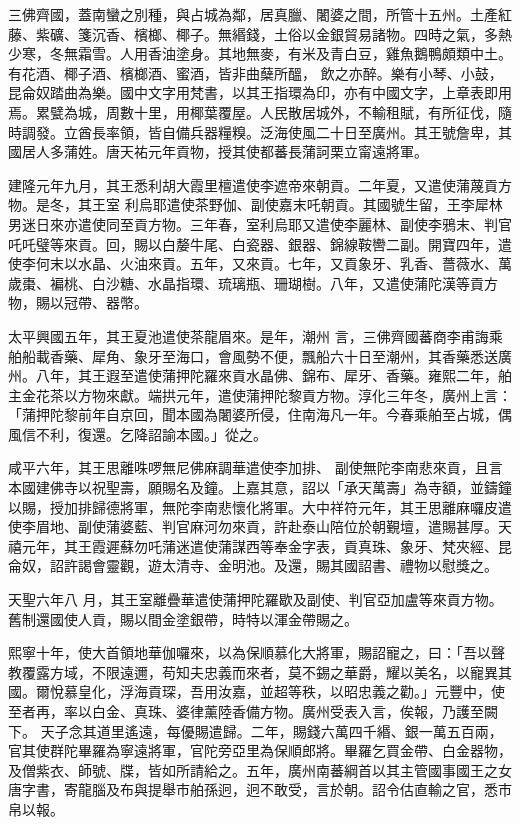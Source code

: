 \begin{pinyinscope}
 三佛齊國，蓋南蠻之別種，與占城為鄰，居真臘、闍婆之間，所管十五州。土產紅藤、紫礦、箋沉香、檳榔、椰子。無緡錢，土俗以金銀貿易諸物。四時之氣，多熱少寒，冬無霜雪。人用香油塗身。其地無麥，有米及青白豆，雞魚鵝鴨頗類中土。有花酒、椰子酒、檳榔酒、蜜酒，皆非曲蘖所醞，
 飲之亦醉。樂有小琴、小鼓，昆侖奴踏曲為樂。國中文字用梵書，以其王指環為印，亦有中國文字，上章表即用焉。累甓為城，周數十里，用椰葉覆屋。人民散居城外，不輸租賦，有所征伐，隨時調發。立酋長率領，皆自備兵器糧糗。泛海使風二十日至廣州。其王號詹卑，其國居人多蒲姓。唐天祐元年貢物，授其使都蕃長蒲訶栗立甯遠將軍。



 建隆元年九月，其王悉利胡大霞里檀遣使李遮帝來朝貢。二年夏，又遣使蒲蔑貢方物。是冬，其王室
 利烏耶遣使茶野伽、副使嘉末吒朝貢。其國號生留，王李犀林男迷日來亦遣使同至貢方物。三年春，室利烏耶又遣使李麗林、副使李鴉末、判官吒吒璧等來貢。回，賜以白嫠牛尾、白瓷器、銀器、錦線鞍轡二副。開寶四年，遣使李何末以水晶、火油來貢。五年，又來貢。七年，又貢象牙、乳香、薔薇水、萬歲棗、褊桃、白沙糖、水晶指環、琉璃瓶、珊瑚樹。八年，又遣使蒲陀漢等貢方物，賜以冠帶、器幣。



 太平興國五年，其王夏池遣使茶龍眉來。是年，潮州
 言，三佛齊國蕃商李甫誨乘舶船載香藥、犀角、象牙至海口，會風勢不便，飄船六十日至潮州，其香藥悉送廣州。八年，其王遐至遣使蒲押陀羅來貢水晶佛、錦布、犀牙、香藥。雍熙二年，舶主金花茶以方物來獻。端拱元年，遣使蒲押陀黎貢方物。淳化三年冬，廣州上言：「蒲押陀黎前年自京回，聞本國為闍婆所侵，住南海凡一年。今春乘舶至占城，偶風信不利，復還。乞降詔諭本國。」從之。



 咸平六年，其王思離咮啰無尼佛麻調華遣使李加排、
 副使無陀李南悲來貢，且言本國建佛寺以祝聖壽，願賜名及鐘。上嘉其意，詔以「承天萬壽」為寺額，並鑄鐘以賜，授加排歸德將軍，無陀李南悲懷化將軍。大中祥符元年，其王思離麻囉皮遣使李眉地、副使蒲婆藍、判官麻河勿來貢，許赴泰山陪位於朝覲壇，遣賜甚厚。天禧元年，其王霞遲蘇勿吒蒲迷遣使蒲謀西等奉金字表，貢真珠、象牙、梵夾經、昆侖奴，詔許謁會靈觀，遊太清寺、金明池。及還，賜其國詔書、禮物以慰獎之。



 天聖六年八
 月，其王室離疊華遣使蒲押陀羅歇及副使、判官亞加盧等來貢方物。舊制還國使人貢，賜以間金塗銀帶，時特以渾金帶賜之。



 熙寧十年，使大首領地華伽囉來，以為保順慕化大將軍，賜詔寵之，曰：「吾以聲教覆露方域，不限遠邇，苟知夫忠義而來者，莫不錫之華爵，耀以美名，以寵異其國。爾悅慕皇化，浮海貢琛，吾用汝嘉，並超等秩，以昭忠義之勸。」元豐中，使至者再，率以白金、真珠、婆律薰陸香備方物。廣州受表入言，俟報，乃護至闕下。
 天子念其道里遙遠，每優賜遣歸。二年，賜錢六萬四千緡、銀一萬五百兩，官其使群陀畢羅為寧遠將軍，官陀旁亞里為保順郎將。畢羅乞買金帶、白金器物，及僧紫衣、師號、牒，皆如所請給之。五年，廣州南蕃綱首以其主管國事國王之女唐字書，寄龍腦及布與提舉市舶孫迥，迥不敢受，言於朝。詔令估直輸之官，悉市帛以報。




\end{pinyinscope}
